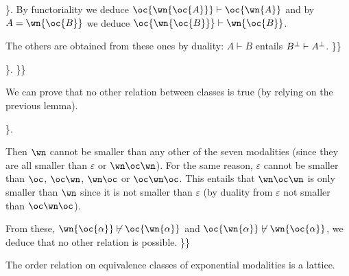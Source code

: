 \}. By functoriality we deduce \(\oc{\wn{\oc{A}}}\vdash \oc{\wn{A}}\)
and by \(A=\wn{\oc{B}}\) we deduce
\(\oc{\wn{\oc{B}}}\vdash \wn{\oc{B}}\).

The others are obtained from these ones by duality: \(A\vdash B\)
entails \(B^\bot\vdash A^\bot\). \}\}

\}. \}\}

We can prove that no other relation between classes is true (by relying
on the previous lemma).

\}.

Then \(\wn\) cannot be smaller than any other of the seven modalities
(since they are all smaller than \(\varepsilon\) or \(\wn\oc\wn\)). For
the same reason, \(\varepsilon\) cannot be smaller than \(\oc\),
\(\oc\wn\), \(\wn\oc\) or \(\oc\wn\oc\). This entails that \(\wn\oc\wn\)
is only smaller than \(\wn\) since it is not smaller than
\(\varepsilon\) (by duality from \(\varepsilon\) not smaller than
\(\oc\wn\oc\)).

From these, \(\wn{\oc{\alpha}}\not\vdash\oc{\wn{\alpha}}\) and
\(\oc{\wn{\alpha}}\not\vdash\wn{\oc{\alpha}}\), we deduce that no other
relation is possible. \}\}

The order relation on equivalence classes of exponential modalities is a
lattice.

